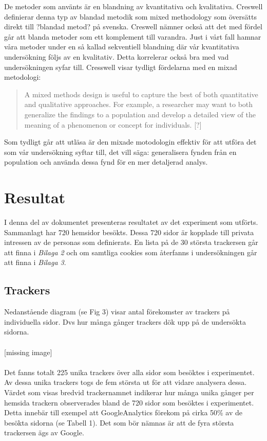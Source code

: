 \documentclass[a4paper,11pt]{article}
\begin{document}
{De metoder som använts är en blandning av kvantitativa och kvalitativa. Creswell \cite{Creswell} definierar denna typ av blandad metodik som mixed methodology som översätts direkt till ?blandad metod? på svenska. Creswell \cite{Creswell} nämner också att det med fördel går att blanda metoder som ett komplement till varandra. Just i vårt  fall hamnar våra metoder under en så kallad sekventiell blandning där vår kvantitativa undersökning följs av en kvalitativ. Detta korrelerar också bra med vad undersökningen syfar till. Cresswell \cite{Creswell} visar tydligt fördelarna med en mixad metodologi: 

\begin{quote}
A mixed methods design is useful to capture the best of both quantitative and qualitative approaches. For example, a researcher may want to both generalize the findings to a population and develop a detailed view of the meaning of a phenomenon or concept for individuals. [?] 
\end{quote}

Som tydligt går att utläsa är den mixade motodologin effektiv för att utföra det som vår undersökning syftar till, det vill säga: generalisera fynden från en population och använda dessa fynd för en mer detaljerad analys. 

\section{Resultat}
I denna del av dokumentet presenteras resultatet av det experiment som utförts. Sammanlagt har 720 hemsidor besökts. Dessa 720 sidor är kopplade till privata intressen av de personas som definierats. En lista på de 30 största trackersen går att finna i \textit{Bilaga 2} och om samtliga cookies som återfanns i undersökningen går att finna i \textit{Bilaga 3}.

\subsection{Trackers}
Nedanstående diagram (se Fig 3) visar antal förekomster av trackers på individuella sidor. Dvs hur många gånger trackers dök upp på de undersökta sidorna. \\\\

[missing image]\\\\


Det fanns totalt 225 unika trackers över alla sidor som besöktes i experimentet. Av dessa unika trackers togs de fem största ut för att vidare analysera dessa. Värdet som visas bredvid trackernamnet indikerar hur många unika gånger per hemsida trackern observerades bland de 720 sidor som besöktes i experimentet. Detta innebär till exempel att GoogleAnalytics förekom på cirka 50\% av de besökta sidorna (se Tabell 1). Det som bör nämnas är att de fyra största trackersen ägs av Google. 

}
\end{document}
